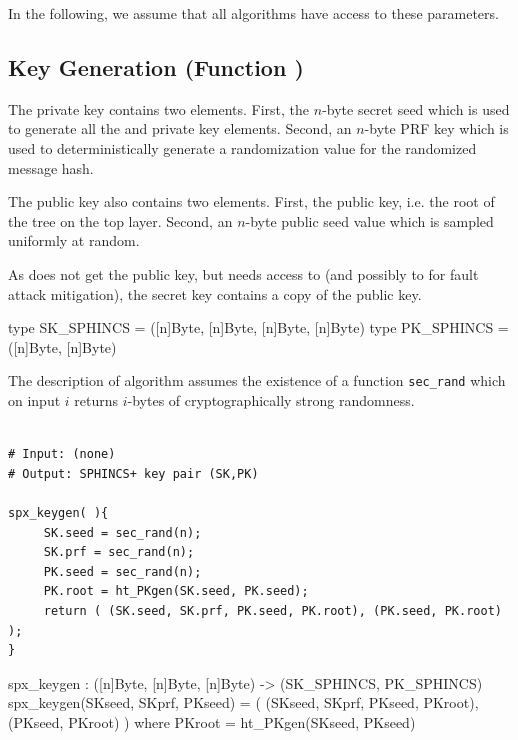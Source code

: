 In the following, we assume that all algorithms have access to these parameters.

\subsection{\spx Key Generation (Function \spxkgen)}

   The \spx private key contains two elements. First, the $n$-byte secret seed 
   \sseed which is used to generate all the \wotsp and \fors private key elements. 
   Second, an $n$-byte PRF key \skprf which is used to deterministically 
   generate a randomization value for the randomized message hash. 

   The \spx public key also contains two elements. First, the \hyper public key, 
   i.e. the root of the tree on the top layer. Second, an $n$-byte public seed
   value \pseed which is sampled uniformly at random.
   
   As \spxsign does not get the public key, but needs access to \pseed (and 
   possibly to \proot for fault attack mitigation), the \spx secret key contains 
   a copy of the public key.

\begin{code}
  type SK_SPHINCS = ([n]Byte, [n]Byte, [n]Byte, [n]Byte)
  type PK_SPHINCS = ([n]Byte, [n]Byte) 
\end{code}
   
   The description of algorithm \spxkgen assumes the existence of a function 
   \texttt{sec\_rand} which on input $i$ returns $i$-bytes of cryptographically strong
   randomness.

\begin{lstlisting}[label=alg:spx:pkgen, language=pseudoc,
                   caption=\spxkgen\ -- Generate a \spx key pair.]

# Input: (none)
# Output: SPHINCS+ key pair (SK,PK)

spx_keygen( ){          
     SK.seed = sec_rand(n);
     SK.prf = sec_rand(n);
     PK.seed = sec_rand(n);
     PK.root = ht_PKgen(SK.seed, PK.seed);
     return ( (SK.seed, SK.prf, PK.seed, PK.root), (PK.seed, PK.root) );
}

\end{lstlisting}

\begin{code}
  spx_keygen : ([n]Byte, [n]Byte, [n]Byte) -> (SK_SPHINCS, PK_SPHINCS)
  spx_keygen(SKseed, SKprf, PKseed) =
    ( (SKseed, SKprf, PKseed, PKroot), (PKseed, PKroot) )
    where 
      PKroot = ht_PKgen(SKseed, PKseed)
\end{code}

